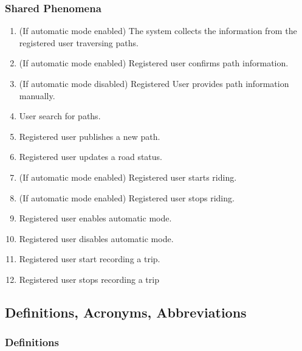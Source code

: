 \subsubsection{Shared Phenomena}
\begin{enumerate}[label=\textbf{SP\arabic*:}]
    \item (If automatic mode enabled) The system collects the information from the registered user traversing paths.
    \item (If automatic mode enabled) Registered user confirms path information.
    \item (If automatic mode disabled) Registered User provides path information manually.
    \item User search for paths.
    \item Registered user publishes a new path.
    \item Registered user updates a road status.
    \item (If automatic mode enabled) Registered user starts riding.
    \item (If automatic mode enabled) Registered user stops riding.
    \item Registered user enables automatic mode.
    \item Registered user disables automatic mode.
    \item Registered user start recording a trip.
    \item Registered user stops recording a trip
\end{enumerate}

\subsection{Definitions, Acronyms, Abbreviations}

\subsubsection{Definitions}

